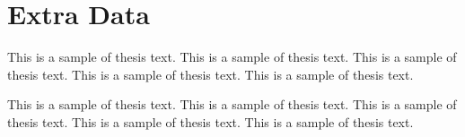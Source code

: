 \documentclass[12pt,oneside]{book} %
\begin{document}
\chapter{Extra Data}
This is a sample of thesis text. This is a sample of thesis text. This is a 
sample of thesis text. This is a sample of thesis text. This is a sample of
thesis text.

This is a sample of thesis text. This is a sample of thesis text. This is a 
sample of thesis text. This is a sample of thesis text. This is a sample of
thesis text.
\end{document}
